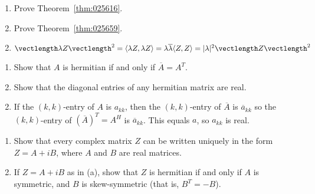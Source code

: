 \begin{multicols}{2}
\begin{ex}
\begin{enumerate}[label={\alph*.}]
\item Prove Theorem~\ref{thm:025616}.

\item Prove Theorem~\ref{thm:025659}.

\end{enumerate}
\begin{sol}
\begin{enumerate}[label={\alph*.}]
\setcounter{enumi}{1}
\item  $\vectlength \lambda Z \vectlength^2 = \langle \lambda Z, \lambda Z \rangle = \lambda\overline{\lambda} \langle Z, Z \rangle = |\lambda|^2 \vectlength Z \vectlength^2$


\end{enumerate}
\end{sol}
\end{ex}

\begin{ex}
\begin{enumerate}[label={\alph*.}]
\item Show that $A$ is hermitian if and only if $\overline{A} = A^T$.

\item Show that the diagonal entries of any hermitian matrix are real.

\end{enumerate}
\begin{sol}
\begin{enumerate}[label={\alph*.}]
\setcounter{enumi}{1}
\item  If the $(k, k)$-entry of $A$ is $a_{kk}$, then the $(k, k)$-entry of $\overline{A}$ is $\overline{a}_{kk}$ so the $(k, k)$-entry of $(\overline{A})^T = A^{H}$ is $\overline{a}_{kk}$. This equals $a$, so $a_{kk}$ is real.

\end{enumerate}
\end{sol}
\end{ex}

\begin{ex}
\begin{enumerate}[label={\alph*.}]
\item Show that every complex matrix $Z$ can be written uniquely in the form $Z = A + iB$, where $A$ and $B$ are real matrices.

\item If $Z = A + iB$ as in (a), show that $Z$ is hermitian if and only if $A$ is symmetric, and $B$ is skew-symmetric (that is, $B^{T} = -B$).

\end{enumerate}
\end{ex}


\end{multicols}
